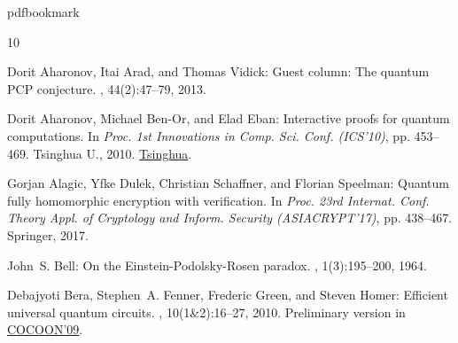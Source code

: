 \documentclass[11pt]{article}
\numberwithin{equation}{section}
\theoremstyle{definition}
\theoremstyle{plain}
\begin{document}
 
 


\newcommand{\prelim}{Preliminary version in\ }\newcommand{\prelims}{Preliminary
  versions in\ }
\providecommand{\bibhead}[1]{}
\expandafter\ifx\csname pdfbookmark\endcsname\relax%
  \providecommand{\tocrefpdfbookmark}{}
\else\providecommand{\tocrefpdfbookmark}{%
   \hypertarget{tocreferences}{}%
   \pdfbookmark[1]{References}{tocreferences}}%
\fi

\tocrefpdfbookmark
\begin{thebibliography}{10}

\bibhead{AharonovAV13}
{\sc Dorit Aharonov, Itai Arad, and Thomas Vidick}: Guest column: {T}he quantum
  {PCP} conjecture.
, 44(2):47--79, 2013.

\bibhead{aharonov10qpip}
{\sc Dorit Aharonov, Michael Ben{-}Or, and Elad Eban}: Interactive proofs for
  quantum computations.
\newblock In {\em Proc. 1st Innovations in Comp. Sci. Conf. (ICS'10)}, pp.
  453--469. Tsinghua U., 2010.
\newblock
  \href{https://conference.iiis.tsinghua.edu.cn/ICS2010/content/papers/35.html}{Tsinghua}.

\bibhead{alagic2017quantum}
{\sc Gorjan Alagic, Yfke Dulek, Christian Schaffner, and Florian Speelman}:
  Quantum fully homomorphic encryption with verification.
\newblock In {\em Proc. 23rd Internat. Conf. Theory Appl. of Cryptology and
  Inform. Security (ASIACRYPT'17)}, pp. 438--467. Springer, 2017.

\bibhead{Bell:64a}
{\sc John~S. Bell}: On the {E}instein-{P}odolsky-{R}osen paradox.
, 1(3):195--200, 1964.

\bibhead{BeraFGH10}
{\sc Debajyoti Bera, Stephen~A. Fenner, Frederic Green, and Steven Homer}:
  Efficient universal quantum circuits.
, 10(1{\&}2):16--27, 2010.
\newblock \prelim
  \href{https://link.springer.com/chapter/10.1007/978-3-642-02882-3\_42}{COCOON'09}.


\end{thebibliography}
\end{document}
